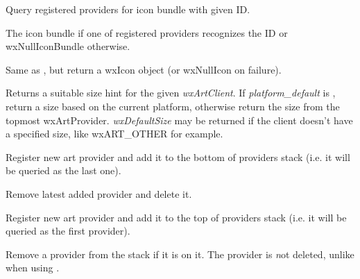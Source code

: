 Query registered providers for icon bundle with given ID.





The icon bundle if one of registered providers recognizes the ID or wxNullIconBundle otherwise.


\label{wxartprovidergeticon}


Same as , but
return a wxIcon object (or wxNullIcon on failure).


Returns a suitable size hint for the given {\it wxArtClient}. If 
{\it platform\_default} is \true, return a size based on the current platform, 
otherwise return the size from the topmost wxArtProvider. {\it wxDefaultSize} may be 
returned if the client doesn't have a specified size, like wxART\_OTHER for example.


\label{wxartproviderinsert}


Register new art provider and add it to the bottom of providers stack (i.e.
it will be queried as the last one).




\label{wxartproviderctor}


Remove latest added provider and delete it.


\label{wxartproviderpush}


Register new art provider and add it to the top of providers stack (i.e. it
will be queried as the first provider).




\label{wxartproviderremove}


Remove a provider from the stack if it is on it. The provider is {\emph not} 
deleted, unlike when using .

